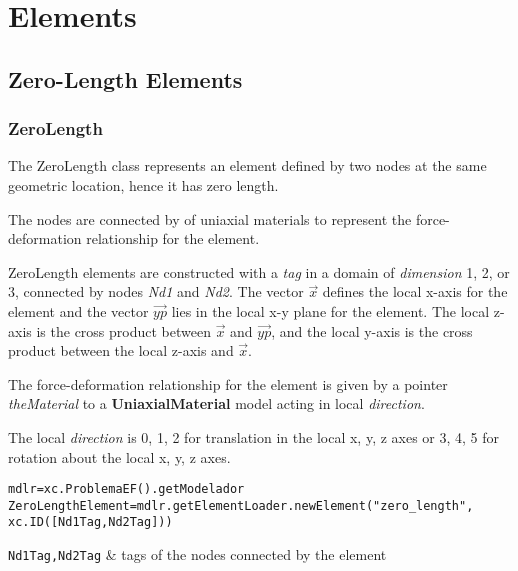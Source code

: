 \chapter{Elements}

\section{Zero-Length Elements}
\subsection{ZeroLength}
The ZeroLength class represents an element defined by two nodes at the same geometric location, hence it has zero length.

The nodes are connected by of uniaxial materials to represent the force-deformation relationship for the element. 

ZeroLength elements are constructed with a {\em tag} in a domain of {\em dimension} 1, 2, or 3, connected by nodes {\em Nd1} and {\em Nd2}. 
The vector $\vec{x}$ defines the local x-axis for the element and the vector $\vec{yp}$ lies in the local x-y plane for the element.  The local z-axis is the cross product between $\vec{x}$ and $\vec{yp}$, and the local y-axis is the cross product between the local z-axis and $\vec{x}$.

The force-deformation relationship for the element is given by a pointer {\em theMaterial} to a {\bf UniaxialMaterial} model acting in local {\em direction}.

The local {\em direction} is 0, 1, 2 for translation in the local x, y, z axes or 3, 4, 5 for rotation about the local x, y, z axes. 

\begin{verbatim}
mdlr=xc.ProblemaEF().getModelador
ZeroLengthElement=mdlr.getElementLoader.newElement("zero_length",
xc.ID([Nd1Tag,Nd2Tag]))
\end{verbatim}
\begin{paramFuncTable}
{\tt Nd1Tag,Nd2Tag} & tags of the nodes connected by the element\\
\end{paramFuncTable}

\begin{paramClassTable}
\ElementParam{}
\ElementZERODParam{}
\end{paramClassTable}

\begin{methodsTable}
\ElementMeth{}
\ElementZERODMeth{}
\ZeroLengthMeth{}
\end{methodsTable}

